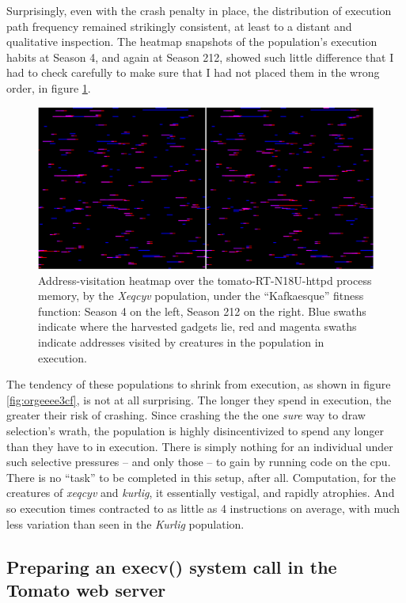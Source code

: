 \documentclass[12pt,glossary]{dalthesis}
\begin{document}
Surprisingly, even with the crash penalty in place, the distribution of execution
path frequency remained strikingly consistent, at least to a distant and qualitative
inspection. The heatmap snapshots of the population's execution habits at Season 4,
and again at Season 212, showed such little difference that I had to check carefully
to make sure that I had not placed them in the wrong order, in figure
\ref{fig:org55e4518}. 

\begin{figure}[htbp]
\centering
\includegraphics[width=.9\linewidth]{../images/plots/xeqcyv_kafka_heatmap_beginning_end.pdf}
\caption{\label{fig:org55e4518}
Address-visitation heatmap over the tomato-RT-N18U-httpd process memory, by the \emph{Xeqcyv} population, under the ``Kafkaesque'' fitness function: Season 4 on the left, Season 212 on the right. Blue swaths indicate where the harvested gadgets lie, red and magenta swaths indicate addresses visited by creatures in the population in execution.}
\end{figure}


The tendency of these populations to shrink from execution, as shown in figure
\ref{fig:orgeeee3cf}, is not at all surprising. The longer they spend in
execution, the greater their risk of crashing. Since crashing the the one \emph{sure}
way to draw selection's wrath, the population is highly disincentivized to spend
any longer than they have to in execution. There is simply nothing for an
individual under such selective pressures -- and only those -- to gain by
running code on the \gls{cpu}. There is no ``task'' to be completed in this setup,
after all. Computation, for the creatures of \emph{xeqcyv} and \emph{kurlig}, it essentially
vestigal, and rapidly atrophies. And so execution times contracted to as little
as 4 instructions on average, with much less variation than seen in the
\emph{Kurlig} population.

\subsection{Preparing an execv() system call in the Tomato web server}
\label{sec:orgac108f0}
\label{orgb23b06c}
\end{document}
